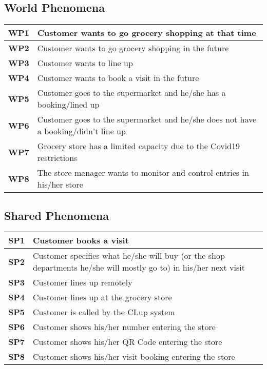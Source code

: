 \subsection{World Phenomena} %
\begin{center}
    {\renewcommand{\arraystretch}{2}%
    \begin{tabular}{L{2cm}L{12cm}}
        \hline
        \textbf{WP1} & Customer wants to go grocery shopping at that time \\
        \hline
        \textbf{WP2} & Customer wants to go grocery shopping in the future \\
        \hline
        \textbf{WP3} & Customer wants to line up \\
        \hline
        \textbf{WP4} & Customer wants to book a visit in the future \\
        \hline
        \textbf{WP5} & Customer goes to the supermarket and he/she has a booking/lined up \\
        \hline
        \textbf{WP6} & Customer goes to the supermarket and he/she does not have a booking/didn't line up \\
        \hline
        \textbf{WP7} & Grocery store has a limited capacity due to the Covid19 restrictions \\
        \hline
        \textbf{WP8} & The store manager wants to monitor and control entries in his/her store \\
        \hline
    \end{tabular}}
\end{center}

\subsection{Shared Phenomena}
\begin{center}
    {\renewcommand{\arraystretch}{2}%
    \begin{tabular}{L{2cm}L{12cm}}
        \hline
        \textbf{SP1} & Customer books a visit \\
        \hline
        \textbf{SP2} & Customer specifies what he/she will buy (or the shop departments he/she will mostly go to) in his/her next visit \\
        \hline
        \textbf{SP3} & Customer lines up remotely \\
        \hline
        \textbf{SP4} & Customer lines up at the grocery store \\
        \hline
        \textbf{SP5} & Customer is called by the CLup system \\
        \hline
        \textbf{SP6} & Customer shows his/her number entering the store \\
        \hline
        \textbf{SP7} & Customer shows his/her QR Code entering the store \\
        \hline
        \textbf{SP8} & Customer shows his/her visit booking entering the store \\
    \end{tabular}}
\end{center}

